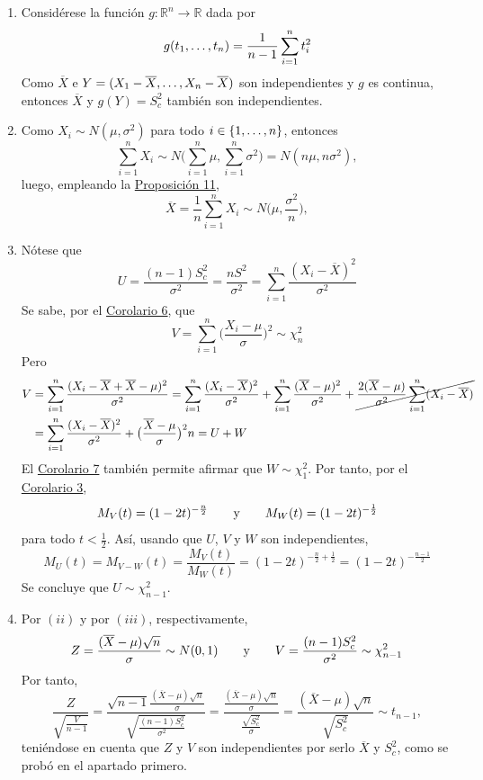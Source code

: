 \documentclass[11pt]{report}
\makeatletter
\renewenvironment{proof}[1][\proofname]{\par
  \pushQED{\qed}%
  \normalfont \topsep\z@skip %
  \trivlist
  \item[\hskip\labelsep
        \itshape
    #1\@addpunct{.}]\ignorespaces
}{%
  \popQED\endtrivlist\@endpefalse
}
\theoremstyle{definition}
\newcommand{\R}{\mathbb R}
\makeatother
\begin{document}
\begin{proof}

\hfill

\begin{enumerate}
    \item Considérese la función $g \colon \R^n \to \R$ dada por
    \[g(t_1,\mathellipsis,t_n) = \frac{1}{n-1} \sum_{i=1}^n t_i^2\]
    Como $\overline{X}$ e $Y = (X_1-\overline{X},\mathellipsis,X_n-\overline{X})$ son independientes y $g$ es continua, entonces $\overline{X}$ y $g(Y) = S^2_c$ también son independientes.
    \item Como $X_i \sim N(\mu,\sigma^2)$ para todo $i \in \{1,\mathellipsis,n\}$, entonces
    \[\sum_{i=1}^n X_i \sim N\bigl(\sum_{i=1}^n \mu, \sum_{i=1}^n \sigma^2\bigr) = N(n\mu, n\sigma^2),\]
    luego, empleando la \hyperref[prop2.5]{\color{blue}Proposición 11},
    \[\overline{X} = \frac{1}{n}\sum_{i=1}^n X_i \sim N\bigl(\mu,\frac{\sigma^2}{n}\bigr),\]
    \item Nótese que
    \[U = \frac{(n-1)S^2_c}{\sigma^2} = \frac{nS^2}{\sigma^2} = \sum_{i=1}^n\frac{(X_i-\overline{X})^2}{\sigma^2}\]
    Se sabe, por el \hyperref[cor2.17]{\color{blue}Corolario 6}, que 
    \[V = \sum_{i=1}^n\bigl(\frac{X_i-\mu}{\sigma}\bigr)^2  \sim \chi^2_n\]
    Pero
    \[
    \begin{aligned}[t]
    V &=\sum_{i=1}^n\frac{ (X_i-\overline{X}+\overline{X}-\mu)^2}{\sigma^2}= \sum_{i=1}^n\frac{(X_i-\overline{X})^2}{\sigma^2}+\sum_{i=1}^n \frac{(\overline{X}-\mu)^2}{\sigma^2}+\cancel{\frac{2(\overline{X}-\mu)}{\sigma^2}\sum_{i=1}^n(X_i-\overline{X})} \\ &= \sum_{i=1}^n\frac{(X_i-\overline{X})^2}{\sigma^2}+\bigl(\frac{\overline{X}-\mu}{\sigma}\bigr)^2n = U+W
    \end{aligned}
    \]
    El \hyperref[cor2.18]{\color{blue}Corolario 7} también permite afirmar que $W \sim \chi^2_1$. Por tanto, por el \hyperref[cor2.14]{\color{blue}Corolario 3},
    \[M_V(t) = (1-2t)^{-\frac{n}{2}} \qquad \textup{y} \qquad M_W(t) = (1-2t)^{-\frac{1}{2}}\]
    para todo $t < \frac{1}{2}$. Así, usando que $U$, $V$ y $W$ son independientes,
    \[M_U(t) = M_{V-W}(t)=\frac{M_V(t)}{M_W(t)} = (1-2t)^{-\frac{n}{2}+\frac{1}{2}} = (1-2t)^{-\frac{n-1}{2}}\]
    Se concluye que $U \sim \chi^2_{n-1}$.
    \item Por $(ii)$ y por $(iii)$, respectivamente,
    \[Z=\frac{(\overline{X}-\mu)\sqrt{n}}{\sigma} \sim N(0,1) \qquad \textup{y} \qquad V=\frac{(n-1)S^2_c}{\sigma^2}\sim \chi^2_{n-1}\]
    Por tanto,
    \[\frac{Z}{\sqrt{\frac{V}{n-1}}} = \frac{\sqrt{n-1}\frac{(\overline{X}-\mu)\sqrt{n}}{\sigma}}{\sqrt{{\frac{(n-1)S^2_c}{\sigma^2}}}} = \frac{\frac{(\overline{X}-\mu)\sqrt{n}}{\sigma}}{\frac{\sqrt{S^2_c}}{\sigma}} = \frac{(\overline{X}-\mu)\sqrt{n}}{\sqrt{S^2_c}} \sim t_{n-1},\]
    teniéndose en cuenta que $Z$ y $V$ son independientes por serlo $\overline{X}$ y $S^2_c$, como se probó en el apartado primero. \qedhere
\end{enumerate}
    
\end{proof}
\end{document}
